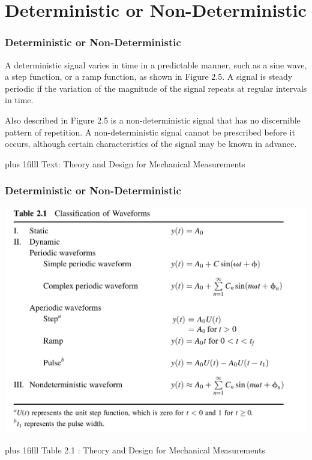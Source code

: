 \documentclass[fleqn]{beamer} %
\newcommand{\sectiontitleIV}{Deterministic or Non-Deterministic}
\newcommand{\btVFill}{\vskip0pt plus 1filll}
\begin{document}
\section{\sectiontitleIV}	
\begin{frame}[label=sectionIV] \small
\frametitle{\sectiontitleIV}
\bigskip

A deterministic signal varies in time in a predictable
manner, such as a sine wave, a step function, or a ramp function, as shown in Figure 2.5. A signal is
steady periodic if the variation of the magnitude of the signal repeats at regular intervals in time.

Also described in Figure 2.5 is a non-deterministic signal that has no discernible pattern of
repetition. A non-deterministic signal cannot be prescribed before it occurs, although certain characteristics of the signal may be known in advance.

\btVFill
\tiny{Text: Theory and Design for Mechanical Measurements}	
\end{frame}

\begin{frame}[label=sectionIV] \small
\frametitle{\sectiontitleIV}
\bigskip

\includegraphics[scale=.15]{table_2_1.png}

\btVFill
\tiny{Table 2.1 : Theory and Design for Mechanical Measurements}	
\end{frame}
\end{document}
